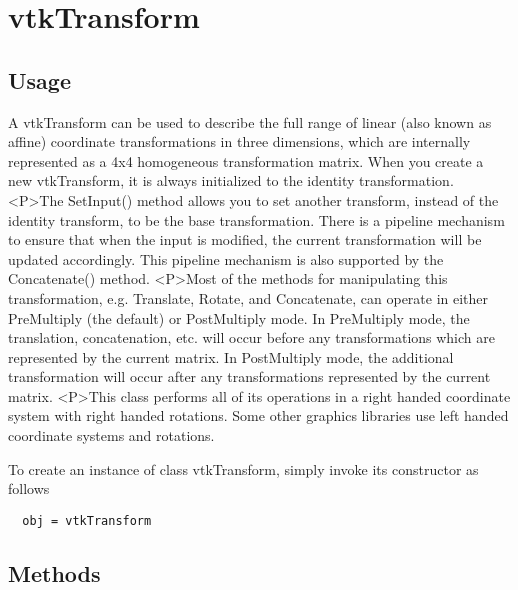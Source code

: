 \section{vtkTransform}

\subsection{Usage}

 A vtkTransform can be used to describe the full range of linear (also
 known as affine) coordinate transformations in three dimensions,
 which are internally represented as a 4x4 homogeneous transformation
 matrix.  When you create a new vtkTransform, it is always initialized
 to the identity transformation.
 <P>The SetInput() method allows you to set another transform,
 instead of the identity transform, to be the base transformation.
 There is a pipeline mechanism to ensure that when the input is
 modified, the current transformation will be updated accordingly.
 This pipeline mechanism is also supported by the Concatenate() method.
 <P>Most of the methods for manipulating this transformation,
 e.g. Translate, Rotate, and Concatenate, can operate in either
 PreMultiply (the default) or PostMultiply mode.  In PreMultiply
 mode, the translation, concatenation, etc. will occur before any
 transformations which are represented by the current matrix.  In
 PostMultiply mode, the additional transformation will occur after 
 any transformations represented by the current matrix.
 <P>This class performs all of its operations in a right handed
 coordinate system with right handed rotations. Some other graphics
 libraries use left handed coordinate systems and rotations.  

To create an instance of class vtkTransform, simply
invoke its constructor as follows
\begin{verbatim}
  obj = vtkTransform
\end{verbatim}
\subsection{Methods}

